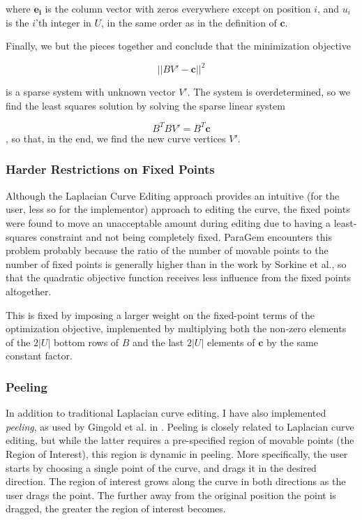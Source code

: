 \documentclass[english]{article}
\begin{document}
where $\mathbf{e_i}$ is the column vector with zeros everywhere except on position $i$, and $u_i$ is the $i$'th integer in $U$, in the same order as in the definition of $\mathbf{c}$.

Finally, we but the pieces together and conclude that the minimization objective

\[
||BV'- \mathbf{c}||^2
\]

is a sparse system with unknown vector $V'$. The system is overdetermined, so we find the least squares solution by solving the sparse linear system

\[
B^TBV' = B^T\mathbf{c}
\],
so that, in the end, we find the new curve vertices $V'$.

\subsubsection{Harder Restrictions on Fixed Points}

Although the Laplacian Curve Editing approach provides an intuitive (for the user, less so for the implementor) approach to editing the curve, the fixed points were found to move an unacceptable amount during editing due to having a least-squares constraint and not being completely fixed. ParaGem encounters this problem probably because the ratio of the number of movable points to the number of fixed points is generally higher than in the work by Sorkine et al., so that the quadratic objective function receives less influence from the fixed points altogether.

This is fixed by imposing a larger weight on the fixed-point terms of the optimization objective, implemented by multiplying both the non-zero elements of the $2|U|$ bottom rows of $B$ and the last $2|U|$ elements of $\mathbf{c}$ by the same constant factor.

\subsubsection{Peeling}

In addition to traditional Laplacian curve editing, I have also implemented \textit{peeling}, as used by Gingold et al. in \cite{gingold09}. Peeling is closely related to Laplacian curve editing, but while the latter requires a pre-specified region of movable points (the Region of Interest), this region is dynamic in peeling. More specifically, the user starts by choosing a single point of the curve, and drags it in the desired direction. The region of interest grows along the curve in both directions as the user drags the point. The further away from the original position the point is dragged, the greater the region of interest becomes.
\end{document}
